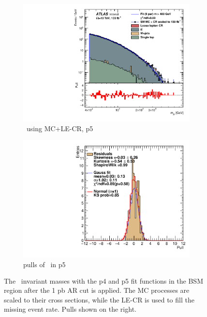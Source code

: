 \begin{figure}[ht]
\begin{subfigure}[h]{0.38\linewidth}
    \includegraphics[scale=0.3]{figs/ch6/fit/variable_nosmooth/p5/1PB/output_SMMCplusCR_Mjb_p5.pdf}%
     \caption{\mjb \ using MC+LE-CR, p5}
     \end{subfigure}
     \hfill
    \begin{subfigure}[h]{0.4\linewidth}
    \includegraphics[scale=0.32]{figs/ch6/fit/variable_nosmooth/p5/1PB/pull_SMMCplusCR_Mjb_p5.pdf}%
    \caption{pulls of \mjb \ in p5}
    \end{subfigure}
    \caption{The \mjb \ invariant masses with the p4 and p5 fit functions in the BSM region after the 1 pb AR cut is applied. The MC processes are scaled to their cross sections, while the LE-CR is used to fill the missing event rate. Pulls shown on the right.}
\label{fig:mjb-fit-pulls-1pb}
\end{figure}


